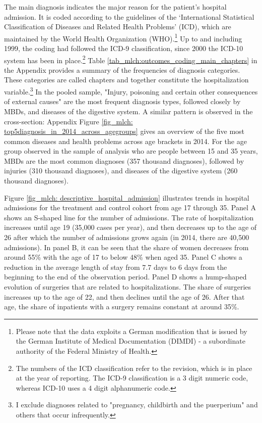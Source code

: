 The main diagnosis indicates the major reason for the patient's hospital admission. It is coded according to the guidelines of the `International Statistical Classification of Diseases and Related Health Problems' (ICD), which are maintained by the World Health Organization (WHO).\footnote{Please note that the data exploits a German modification that is issued by the German Institute of Medical Documentation (DIMDI) - a subordinate authority of the Federal Ministry of Health.} Up to and including 1999, the coding had followed the ICD-9 classification, since 2000 the ICD-10 system has been in place.\footnote{The numbers of the ICD classification refer to the revision, which is in place at the year of reporting. The ICD-9 classification is a 3 digit numeric code, whereas ICD-10 uses a 4 digit alphanumeric code.} Table \ref{tab_mlch:outcomes_coding_main_chapters} in the Appendix provides a summary of the frequencies of diagnosis categories. These categories are called chapters and together constitute the hospitalization variable.\footnote{I exclude diagnoses related to "pregnancy, childbirth and the puerperium" and others that occur infrequently.} In the pooled sample, "Injury, poisoning and certain other consequences of external causes" are the most frequent diagnosis types, followed closely by MBDs, and diseases of the digestive system. A similar pattern is observed in the cross-section: Appendix Figure \ref{fig_mlch: top5diagnosis_in_2014_across_agegroups} gives an overview of the five most common diseases and health problems across age brackets in 2014. For the age group observed in the sample of analysis who are people between 15 and 35 years, MBDs are the most common diagnoses (357 thousand diagnoses), followed by injuries (310 thousand diagnoses), and diseases of the digestive system (260 thousand diagnoses). %




Figure \ref{fig_mlch: descriptive_hospital_admission} illustrates trends in hospital admissions for the treatment and control cohort from age 17 through 35. Panel A shows an S-shaped line for the number of admissions. The rate of hospitalization increases until age 19 (35,000 cases per year), and then decreases up to the age of 26 after which the number of admissions grows again (in 2014, there are 40,500 admissions). In panel B, it can be seen that the share of women decreases from around 55\% with the age of 17 to below 48\% when aged 35. Panel C shows a reduction in the average length of stay from 7.7 days to 6 days from the beginning to the end of the observation period. Panel D shows a hump-shaped evolution of surgeries that are related to hospitalizations. The share of surgeries increases up to the age of 22, and then declines until the age of 26. After that age, the share of inpatients with a surgery remains constant at around 35\%. %



